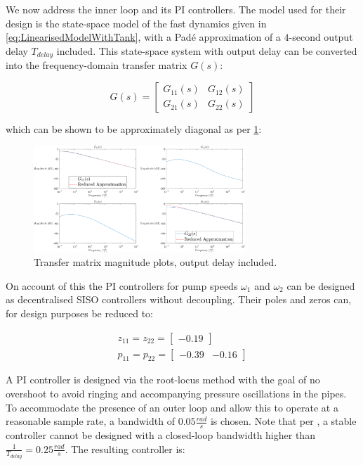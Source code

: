 We now address the inner loop and its PI controllers. The model used for their design is the state-space model of the fast dynamics given in \cref{eq:LinearisedModelWithTank}, with a Padé approximation of a $4$-second output delay $T_{delay}$ included. This state-space system with output delay can be converted into the frequency-domain transfer matrix $G(s)$:

\begin{equation}\label{eq:TransferMatrix}
	G(s) = \begin{bmatrix} G_{11}(s) & G_{12}(s) \\ G_{21}(s) & G_{22}(s)\end{bmatrix}
\end{equation}

which can be shown to be approximately diagonal as per \cref{fig:BodeMagDelayPlot}:

\begin{figure}[h!]
 	\centering
 	\includegraphics[width=\linewidth,height=4cm]{Graphics/PumpMagPlot.pdf}
 	\caption{Transfer matrix magnitude plots, output delay included.}
 	\label{fig:BodeMagDelayPlot}
\end{figure}

On account of this the PI controllers for pump speeds $\omega_1$ and $\omega_2$ can be designed as decentralised SISO controllers without decoupling. Their poles and zeros can, for design purposes be reduced to:

\begin{equation}\label{eq:PumpTFSimple}
	\begin{gathered}
		z_{11} = z_{22} = \begin{bmatrix}-0.19\end{bmatrix} \\
		p_{11} = p_{22} = \begin{bmatrix}-0.39 & -0.16 \end{bmatrix}
	\end{gathered}
\end{equation}

A PI controller is designed via the root-locus method with the goal of no overshoot to avoid ringing and accompanying pressure oscillations in the pipes. To accommodate the presence of an outer loop and allow this to operate at a reasonable sample rate, a bandwidth of $0.05 \frac{\si{rad}}{\si{s}}$ is chosen. Note that per \cite{Skogestad2005}, a stable controller cannot be designed with a closed-loop bandwidth higher than $\frac{1}{T_{delay}} = 0.25 \frac{\si{rad}}{\si{s}}$. The resulting controller is:

